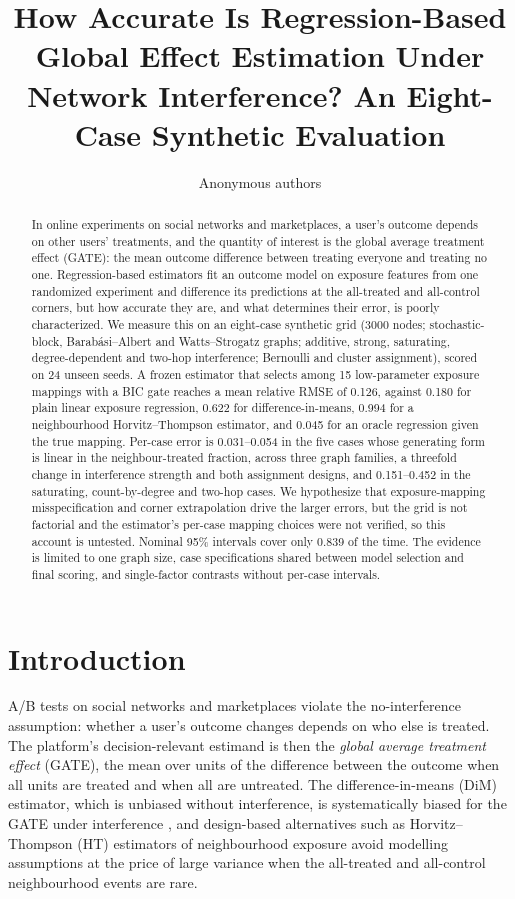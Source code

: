\documentclass{article}
\title{How Accurate Is Regression-Based Global Effect Estimation Under Network Interference? An Eight-Case Synthetic Evaluation}
\author{Anonymous authors}
\begin{document}
\maketitle

\begin{abstract}
In online experiments on social networks and marketplaces, a user's outcome depends on other users' treatments, and the quantity of interest is the global average treatment effect (GATE): the mean outcome difference between treating everyone and treating no one. Regression-based estimators fit an outcome model on exposure features from one randomized experiment and difference its predictions at the all-treated and all-control corners, but how accurate they are, and what determines their error, is poorly characterized. We measure this on an eight-case synthetic grid (3000 nodes; stochastic-block, Barab\'asi--Albert and Watts--Strogatz graphs; additive, strong, saturating, degree-dependent and two-hop interference; Bernoulli and cluster assignment), scored on 24 unseen seeds. A frozen estimator that selects among 15 low-parameter exposure mappings with a BIC gate reaches a mean relative RMSE of 0.126, against 0.180 for plain linear exposure regression, 0.622 for difference-in-means, 0.994 for a neighbourhood Horvitz--Thompson estimator, and 0.045 for an oracle regression given the true mapping. Per-case error is 0.031--0.054 in the five cases whose generating form is linear in the neighbour-treated fraction, across three graph families, a threefold change in interference strength and both assignment designs, and 0.151--0.452 in the saturating, count-by-degree and two-hop cases. We hypothesize that exposure-mapping misspecification and corner extrapolation drive the larger errors, but the grid is not factorial and the estimator's per-case mapping choices were not verified, so this account is untested. Nominal 95\% intervals cover only 0.839 of the time. The evidence is limited to one graph size, case specifications shared between model selection and final scoring, and single-factor contrasts without per-case intervals.
\end{abstract}

\section{Introduction}
A/B tests on social networks and marketplaces violate the no-interference assumption: whether a user's outcome changes depends on who else is treated. The platform's decision-relevant estimand is then the \emph{global average treatment effect} (GATE), the mean over units of the difference between the outcome when all units are treated and when all are untreated. The difference-in-means (DiM) estimator, which is unbiased without interference, is systematically biased for the GATE under interference \citep{Eckles2016Design,Ugander2013GraphCluster}, and design-based alternatives such as Horvitz--Thompson (HT) estimators of neighbourhood exposure \citep{Aronow2013EstimatingAC,Ugander2013GraphCluster} avoid modelling assumptions at the price of large variance when the all-treated and all-control neighbourhood events are rare.
\end{document}
